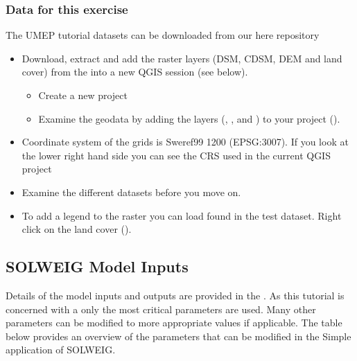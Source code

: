\documentclass[letterpaper,10pt,english]{sphinxmanual}
\begin{document}
\subsubsection{Data for this exercise}
\label{\detokenize{Tutorials/IntroductionToSolweig:data-for-this-exercise}}
The UMEP tutorial datasets can be downloaded from our here repository
\begin{itemize}
\item {} 
Download, extract and add the raster layers (DSM, CDSM, DEM and land
cover) from the  into a new QGIS session (see
below).
\begin{itemize}
\item {} 
Create a new project

\item {} 
Examine the geodata by adding the layers (,
,  and ) to your project ().

\end{itemize}

\item {} 
Coordinate system of the grids is Sweref99 1200 (EPSG:3007). If you
look at the lower right hand side you can see the CRS used in the
current QGIS project

\item {} 
Examine the different datasets before you move on.

\item {} 
To add a legend to the  raster you can load
 found in the test dataset. Right click on the
land cover ().

\end{itemize}


\subsection{SOLWEIG Model Inputs}
\label{\detokenize{Tutorials/IntroductionToSolweig:solweig-model-inputs}}
Details of the model inputs and outputs are provided in the {\hyperref[\detokenize{OtherManuals/SOLWEIG:solweigmanual}]{}}. As this tutorial is
concerned with a  only the most critical
parameters are used. Many other parameters can be modified to more
appropriate values if applicable. The table below provides an overview
of the parameters that can be modified in the Simple application of
SOLWEIG.
\end{document}

